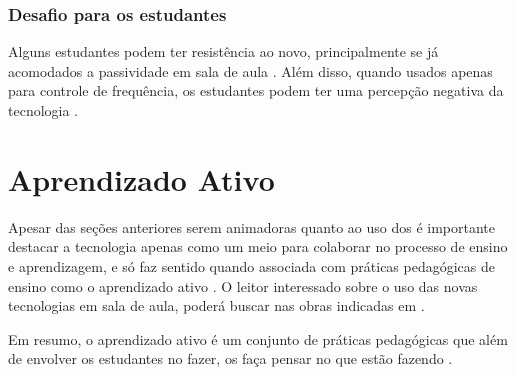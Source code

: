 \subsubsection{Desafio para os estudantes}
Alguns estudantes podem ter resistência ao novo, principalmente se já acomodados
a passividade em sala de aula \cite{Terrion2012, Kay2009}. Além disso, quando
usados apenas para controle de frequência, os estudantes podem ter uma percepção
negativa da tecnologia \cite{Terrion2012, Caldwell2007}.

%


\section{Aprendizado Ativo}\label{section:aprendizado_ativo}

Apesar das seções anteriores serem animadoras quanto ao uso dos
{\clickers} é importante destacar a tecnologia apenas como um meio para
colaborar no processo de ensino e aprendizagem, e só faz sentido quando associada
com práticas pedagógicas de ensino como o aprendizado ativo \cite{Terrion2012, Moran2006}.
O leitor interessado sobre o uso das novas tecnologias em sala de aula, poderá buscar nas obras
indicadas em \cite{portalBrasil2014}.

Em resumo, o aprendizado ativo é um conjunto de práticas pedagógicas
que além de envolver os estudantes no fazer, os faça pensar no que estão fazendo \cite[p. 19]{Charles1991}.

